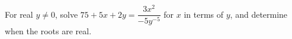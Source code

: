 For real $y\ne0$, solve $75+5x+2y=\dfrac{3x^2}{-5y^{-5}}$ for $x$ in terms of $y$, and determine when the roots are real.
